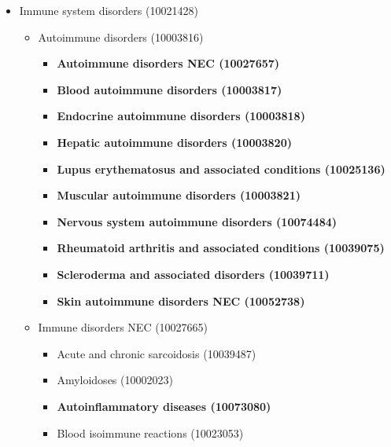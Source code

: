 \documentclass{article}
\begin{document}
\begin{itemize}
    \item Immune system disorders (10021428) \begin{itemize}
              \item Autoimmune disorders (10003816) \begin{itemize}
                                                        \item \textbf{Autoimmune disorders NEC (10027657)}
                                                        \item \textbf{Blood autoimmune disorders (10003817)}
                                                        \item \textbf{Endocrine autoimmune disorders (10003818)}
                                                        \item \textbf{Hepatic autoimmune disorders (10003820)}
                                                        \item \textbf{Lupus erythematosus and associated conditions (10025136)}
                                                        \item \textbf{Muscular autoimmune disorders (10003821)}
                                                        \item \textbf{Nervous system autoimmune disorders (10074484)}
                                                        \item \textbf{Rheumatoid arthritis and associated conditions (10039075)}
                                                        \item \textbf{Scleroderma and associated disorders (10039711)}
                                                        \item \textbf{Skin autoimmune disorders NEC (10052738)}
              \end{itemize}
              \item Immune disorders NEC (10027665) \begin{itemize}
                                                        \item Acute and chronic sarcoidosis (10039487)
                                                        \item Amyloidoses (10002023)
                                                        \item \textbf{Autoinflammatory diseases (10073080)}
                                                        \item Blood isoimmune reactions (10023053)

\end{itemize}
\end{itemize}
\end{itemize}
\end{document}
